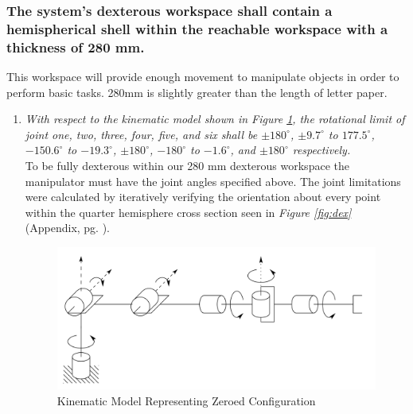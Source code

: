 \documentclass[12pt]{report}
\begin{document}
\subsubsection{The system’s dexterous workspace shall contain a hemispherical shell within the reachable workspace with a thickness of 280 mm.}
This workspace will provide enough movement to manipulate objects in order to perform basic tasks. 280mm is slightly greater than the length of letter paper.
\begin{enumerate}[label=\thesubsubsection.\alph*,leftmargin=3cm,font=\itshape]
  \item \textit{With respect to the kinematic model shown in Figure \ref{fig:zero}, the rotational limit of joint one, two, three, four, five, and six shall be \(\pm180^{\circ}\), \(\pm9.7^{\circ}\) to \(177.5^{\circ}\), \(-150.6^{\circ}\) to \(-19.3^{\circ}\), \(\pm180^{\circ}\), \(-180^{\circ}\) to \(-1.6^{\circ}\), and \(\pm180^{\circ}\) respectively.} \\
  To be fully dexterous within our 280 mm dexterous workspace the manipulator must have the joint angles specified above. The joint limitations were calculated by iteratively verifying the orientation about every point within the quarter hemisphere cross section seen in \emph{Figure \ref{fig:dex}} (Appendix, pg. \pageref{sec:app}).
  \begin{figure}[htp]
    \centering
    \includegraphics[width=.75\textwidth]{zero}
    \caption[Kinematic Model Representing Zeroed Configuration]{Kinematic Model Representing Zeroed Configuration \cite{robo}}
    \label{fig:zero}
  \end{figure}
\end{enumerate}
\end{document}
